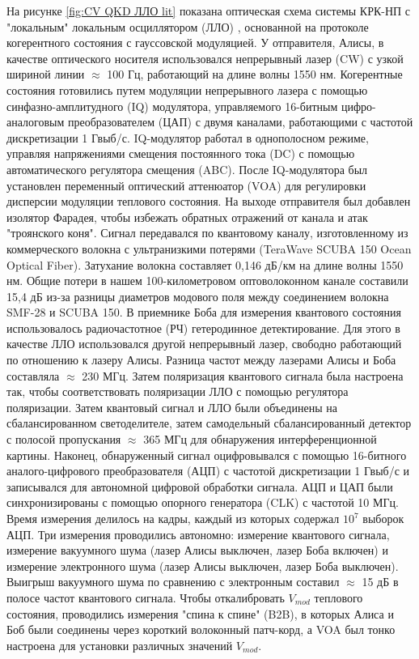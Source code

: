 На рисунке \ref{fig:CV QKD ЛЛО lit} показана оптическая схема  системы КРК-НП с "локальным" локальным осциллятором (ЛЛО) \cite{hajomer2024}, основанной на протоколе когерентного состояния с гауссовской модуляцией. У отправителя, Алисы, в качестве оптического носителя использовался непрерывный лазер (CW) с узкой шириной линии $\approx$ 100 Гц, работающий на длине волны 1550 нм. Когерентные состояния готовились путем модуляции непрерывного лазера с помощью синфазно-амплитудного (IQ) модулятора, управляемого 16-битным цифро-аналоговым преобразователем (ЦАП) с двумя каналами, работающими с частотой дискретизации 1 Гвыб/с. IQ-модулятор работал в однополосном режиме, управляя напряжениями смещения постоянного тока (DC) с помощью автоматического регулятора смещения (ABC). После IQ-модулятора был установлен переменный оптический аттенюатор (VOA) для регулировки дисперсии модуляции теплового состояния. На выходе отправителя был добавлен изолятор Фарадея, чтобы избежать обратных отражений от канала и атак "троянского коня". Сигнал передавался по квантовому каналу, изготовленному из коммерческого волокна с ультранизкими потерями (TeraWave SCUBA 150 Ocean Optical Fiber). Затухание волокна составляет 0,146 дБ/км на длине волны 1550 нм. Общие потери в нашем 100-километровом оптоволоконном канале составили 15,4 дБ из-за разницы диаметров модового поля между соединением волокна SMF-28 и SCUBA 150.
В приемнике Боба для измерения квантового состояния использовалось радиочастотное (РЧ) гетеродинное детектирование. Для этого в качестве ЛЛО использовался другой непрерывный лазер, свободно работающий по отношению к лазеру Алисы. Разница частот между
лазерами Алисы и Боба составляла $\approx$ 230 МГц. Затем поляризация квантового сигнала была настроена так, чтобы соответствовать поляризации ЛЛО с помощью регулятора поляризации. Затем квантовый сигнал и ЛЛО были объединены на сбалансированном светоделителе,
затем самодельный сбалансированный детектор с полосой пропускания
$\approx$ 365 МГц для обнаружения интерференционной картины. Наконец, обнаруженный сигнал оцифровывался с помощью 16-битного аналого-цифрового преобразователя (АЦП) с частотой дискретизации 1 Гвыб/с и записывался для автономной цифровой обработки сигнала. АЦП и ЦАП были синхронизированы с помощью опорного генератора (CLK) с частотой 10 МГц.
Время измерения делилось на кадры, каждый из которых содержал $10^7$ выборок АЦП. Три измерения проводились автономно: измерение квантового сигнала, измерение вакуумного шума (лазер Алисы выключен, лазер Боба включен) и измерение электронного шума (лазер Алисы выключен, лазер Боба выключен). Выигрыш вакуумного шума по сравнению с электронным составил $\approx$ 15 дБ в полосе частот квантового сигнала. Чтобы откалибровать $V_{mod}$ теплового состояния, проводились измерения "спина к спине" (B2B), в которых Алиса и Боб были соединены через короткий волоконный патч-корд, а VOA был тонко настроена для установки различных значений $V_{mod}$.
